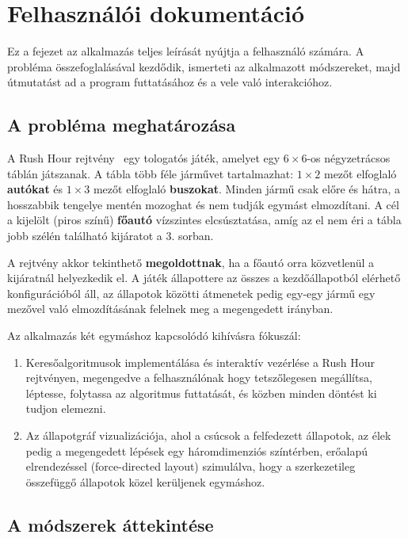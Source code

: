 \chapter{Felhasználói dokumentáció}
\label{ch:user}

Ez a fejezet az alkalmazás teljes leírását nyújtja a felhasználó számára. A probléma összefoglalásával kezdődik, ismerteti az alkalmazott módszereket, majd útmutatást ad a program futtatásához és a vele való interakcióhoz.

\section{A probléma meghatározása}

A Rush Hour rejtvény~\cite{rushhour_puzzle} egy tologatós játék, amelyet egy $6 \times 6$-os négyzetrácsos táblán játszanak. A tábla több féle járművet tartalmazhat: $1 \times 2$ mezőt elfoglaló \textbf{autókat} és $1 \times 3$ mezőt elfoglaló \textbf{buszokat}. Minden jármű csak előre és hátra, a hosszabbik tengelye mentén mozoghat és nem tudják egymást elmozdítani. A cél a kijelölt (piros színű) \textbf{főautó} vízszintes elcsúsztatása, amíg az el nem éri a tábla jobb szélén található kijáratot a 3. sorban.

A rejtvény akkor tekinthető \textbf{megoldottnak}, ha a főautó orra közvetlenül a kijáratnál helyezkedik el. A játék állapottere az összes a kezdőállapotból elérhető konfigurációból áll, az állapotok közötti átmenetek pedig egy-egy jármű egy mezővel való elmozdításának felelnek meg a megengedett irányban.

Az alkalmazás két egymáshoz kapcsolódó kihívásra fókuszál:
\begin{enumerate}
    \item Keresőalgoritmusok implementálása és interaktív vezérlése a Rush Hour rejtvényen, megengedve a felhasználónak hogy tetszőlegesen megállítsa, léptesse, folytassa az algoritmus futtatását, és közben minden döntést ki tudjon elemezni.
    \item Az állapotgráf vizualizációja, ahol a csúcsok a felfedezett állapotok, az élek pedig a megengedett lépések egy háromdimenziós színtérben, erőalapú elrendezéssel (force-directed layout) szimulálva, hogy a szerkezetileg összefüggő állapotok közel kerüljenek egymáshoz.
\end{enumerate}


\section{A módszerek áttekintése}

